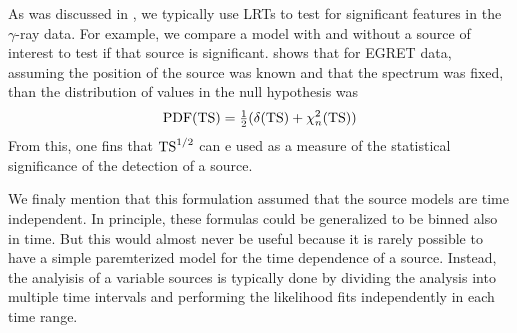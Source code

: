 As was discussed in ,
we typically use \acp{LRT} to test for significant features in
the $\gamma$-ray data.  For example, we compare a model with and
without a source of interest to test if that source is significant.
\cite{mattox_1996a_likelihood-analysis} shows that for \ac{EGRET} data,
assuming the position of the source was known and that the spectrum was
fixed, than the distribution of \ts values in the null hypothesis was
\begin{equation}
  \text{PDF}(\mathrm{TS}) = \tfrac{1}{2} (\delta(\mathrm{TS}) + \chi^2_n(\mathrm{TS}))
\end{equation}
From this, one fins that $\mathrm{TS}^{1/2}$ can e used as a measure of the
statistical significance of the detection of a source.

We finaly mention that this formulation assumed that the source models
are time independent.  In principle, these formulas could be generalized
to be binned also in time. But this would almost never be useful because
it is rarely possible to have a simple paremterized model for the time
dependence of a source. Instead, the analyisis of a variable sources
is typically done by dividing the analysis into multiple time intervals
and performing the likelihood fits independently in each time range.


